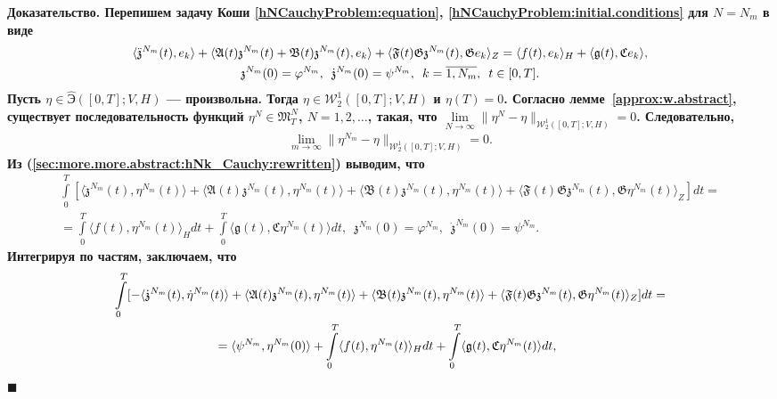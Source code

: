 \documentclass{report}
\newcounter{lem}[section]
\newenvironment{Proof}{\par\noindent\bf Доказательство.\rm}{ $\blacksquare$\par}
\begin{document}
\begin{Proof}
Перепишем задачу Коши \eqref{hNCauchyProblem:equation}, \eqref{hNCauchyProblem:initial.conditions} для $N=N_m$ в виде
\begin{gather}\label{sec:more.more.abstract:hNk_Cauchy:rewritten}
\langle\ddot{\mathfrak{z}}^{N_m}(t),e_k\rangle+\langle\mathfrak{A}(t)\mathfrak{z}^{N_m}(t)+\mathfrak{B}(t)\mathfrak{z}^{N_m}(t),e_k\rangle+
\langle\mathfrak{F}(t) \mathfrak{G}\mathfrak{z}^{N_m}(t), \mathfrak{G}e_k\rangle_Z=\langle f(t), e_k\rangle_H+
\langle\mathfrak{g}(t),\mathfrak{C}e_k\rangle,\\
\notag\mathfrak{z}^{N_m}(0)=\varphi^{N_m},\,\,\,\dot{\mathfrak{z}}^{N_m}(0)=\psi^{N_m},\,\,\,k=\overline{1,N_m},\,\,\,t\in[0,T].
\end{gather}
Пусть $\eta\in\hat{\textrm{Э}}([0,T]; V,H)$ --- произвольна. Тогда $\eta\in\mathcal{W}^1_2([0,T];V,H)$ и $\eta(T)=0$. Согласно лемме~\ref{approx:w.abstract}, существует последовательность функций $\eta^N\in\mathfrak{M}^N_T$, $N=1,2,\dots$, такая, что
$\lim\limits_{N\to\infty} \|\eta^N-\eta\|_{\mathcal{W}^1_2([0,T];V,H)}=0$. Следовательно,
\begin{gather}\label{sec:more.more.abstract:etaNm_convergence}
\lim\limits_{m\to\infty}\|\eta^{N_m}-\eta\|_{\mathcal{W}^1_2([0,T];V,H)}=0.
\end{gather}
Из (\ref{sec:more.more.abstract:hNk_Cauchy:rewritten}) выводим, что
\begin{gather*}
\int\limits_0^T[\langle\ddot{\mathfrak{z}}^{N_m}(t),\eta^{N_m}(t)\rangle+\langle\mathfrak{A}(t)\mathfrak{z}^{N_m}(t),\eta^{N_m}(t)\rangle+
\langle\mathfrak{B}(t)\mathfrak{z}^{N_m}(t),\eta^{N_m}(t)\rangle+\langle\mathfrak{F}(t) \mathfrak{G}\mathfrak{z}^{N_m}(t), \mathfrak{G}\eta^{N_m}(t)\rangle_Z]dt=\\
=\int\limits_0^T\langle f(t),\eta^{N_m}(t)\rangle_Hdt+\int\limits_0^T\langle\mathfrak{g}(t),\mathfrak{C}\eta^{N_m}(t)\rangle dt,\,\,\,
\mathfrak{z}^{N_m}(0)=\varphi^{N_m},\,\,\,\dot{\mathfrak{z}}^{N_m}(0)=\psi^{N_m}.
\end{gather*}
Интегрируя по частям, заключаем, что
\begin{gather}\label{sec:more.more.abstract:zNm_identity}
\int\limits_0^T[-\langle\dot{\mathfrak{z}}^{N_m}(t),\dot{\eta}^{N_m}(t)\rangle+\langle\mathfrak{A}(t)\mathfrak{z}^{N_m}(t),\eta^{N_m}(t)\rangle+
\langle\mathfrak{B}(t)\mathfrak{z}^{N_m}(t),\eta^{N_m}(t)\rangle+\langle\mathfrak{F}(t) \mathfrak{G}\mathfrak{z}^{N_m}(t), \mathfrak{G}\eta^{N_m}(t)\rangle_Z]dt=\\
\notag=\langle\psi^{N_m},\eta^{N_m}(0)\rangle+\int\limits_0^T\langle f(t),\eta^{N_m}(t)\rangle_Hdt+\int\limits_0^T\langle\mathfrak{g}(t),\mathfrak{C}\eta^{N_m}(t)\rangle dt,\,\,\,

\end{gather}
\end{Proof}
\end{document}
